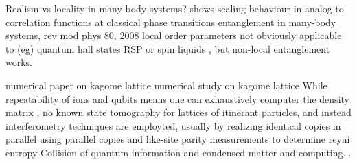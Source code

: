 	Realism vs locality in many-body systems?
		\cite{osborne02}%
		\cite{osterloh02}%
			shows scaling behaviour in analog to correlation functions at classical phase transitions
		\cite{amico08} entanglement in many-body systems, rev mod phys 80, 2008
	local order parameters not obviously applicable to (eg) quantum hall states RSP 
		\cite{jiang12}%
	or spin liquids , but non-local entanglement works.
	
		\cite{isakov11}%
			numerical paper on kagome lattice
		\cite{jiang12}%
			numerical study on kagome lattice
	While repeatability of ions and qubits means one can exhaustively computer the density matrix , 
		\cite{neill16}%
	no known state tomography for lattices of itinerant particles, 
	and instead interferometry techniques are employted, usually by realizing identical copies in parallel
		\cite{brydges19}%
		\cite{daley12}%
			using parallel copies and like-site parity measurements to determine reyni entropy
		\cite{mouraalves04}%
		\cite{palmer05}%
	Collision of quantum information and condensed matter and computing...
		\cite{bakr11}%
		\cite{rodriguez-briones17}%
		\cite{boyin02}%


